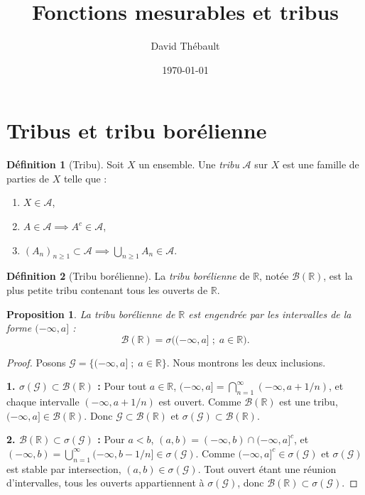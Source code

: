 \documentclass{article}
\title{Fonctions mesurables et tribus}
\author{David Thébault}
\date{\today}
\theoremstyle{remark}
\theoremstyle{definition}
\newtheorem{definition}{Définition}[section]
\theoremstyle{plain}
\newtheorem{proposition}{Proposition}[section]
\begin{document}
\maketitle

\section{Tribus et tribu borélienne}

\begin{definition}[Tribu]
Soit $X$ un ensemble. Une \emph{tribu} $\mathcal A$ sur $X$ est une famille de parties
de $X$ telle que :
\begin{enumerate}
    \item $X \in \mathcal A$,
    \item $A \in \mathcal A \implies A^c \in \mathcal A$,
    \item $(A_n)_{n\ge1} \subset \mathcal A \implies \bigcup_{n\ge1} A_n \in \mathcal A$.
\end{enumerate}
\end{definition}

\begin{definition}[Tribu borélienne]
La \emph{tribu borélienne} de $\mathbb R$, notée $\mathcal B(\mathbb R)$, est la plus petite
tribu contenant tous les ouverts de $\mathbb R$.
\end{definition}

\begin{proposition}
La tribu borélienne de $\mathbb{R}$ est engendrée par les intervalles de la forme $(-\infty,a]$ :
\[
\mathcal{B}(\mathbb{R}) = \sigma\big((-\infty,a] \; ; \; a \in \mathbb{R}\big).
\]
\end{proposition}

\begin{proof}
Posons $\mathcal{G} = \{(-\infty,a]\; ;\; a \in \mathbb{R}\}$.  
Nous montrons les deux inclusions.

\textbf{1. $\sigma(\mathcal G) \subset \mathcal B(\mathbb R)$ :}  
Pour tout $a \in \mathbb R$, $(-\infty,a] = \bigcap_{n=1}^{\infty} (-\infty, a+1/n)$,  
et chaque intervalle $(-\infty,a+1/n)$ est ouvert. Comme $\mathcal B(\mathbb R)$ est une tribu, $(-\infty,a] \in \mathcal B(\mathbb R)$. Donc $\mathcal G \subset \mathcal B(\mathbb R)$ et $\sigma(\mathcal G) \subset \mathcal B(\mathbb R)$.

\textbf{2. $\mathcal B(\mathbb R) \subset \sigma(\mathcal G)$ :}  
Pour $a<b$, $(a,b) = (-\infty,b) \cap (-\infty,a]^c$, et
$(-\infty,b) = \bigcup_{n=1}^{\infty} (-\infty,b-1/n] \in \sigma(\mathcal G)$.
Comme $(-\infty,a]^c \in \sigma(\mathcal G)$ et $\sigma(\mathcal G)$ est stable par intersection, $(a,b) \in \sigma(\mathcal G)$.  
Tout ouvert étant une réunion d'intervalles, tous les ouverts appartiennent à $\sigma(\mathcal G)$, donc $\mathcal B(\mathbb R) \subset \sigma(\mathcal G)$.
\end{proof}
\end{document}
